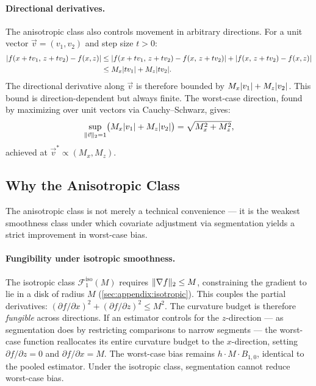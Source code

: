 \paragraph{Directional derivatives.}
The anisotropic class also controls movement in arbitrary directions.
For a unit vector $\vec{v} = (v_1, v_2)$ and step size $t > 0$:
\begin{align}
	\lvert f(x + tv_1,\, z + tv_2) - f(x, z)\rvert
	&\leq \lvert f(x + tv_1,\, z + tv_2) - f(x,\, z + tv_2)\rvert + \lvert f(x,\, z + tv_2) - f(x, z)\rvert \nonumber\\
	&\leq M_x \lvert tv_1\rvert + M_z \lvert tv_2\rvert. \label{eq:aniso_directional}
\end{align}
The directional derivative along $\vec{v}$ is therefore bounded by $M_x\lvert v_1\rvert + M_z\lvert v_2\rvert$.
This bound is direction-dependent but always finite.
The worst-case direction, found by maximizing over unit vectors via Cauchy--Schwarz, gives:
\begin{equation}\label{eq:aniso_worst_direction}
	\sup_{\lVert\vec{v}\rVert_2 = 1} \bigl(M_x\lvert v_1\rvert + M_z\lvert v_2\rvert\bigr) = \sqrt{M_x^2 + M_z^2},
\end{equation}
achieved at $\vec{v}^* \propto (M_x, M_z)$.


\subsection{Why the Anisotropic Class}\label{sec:smoothness:discussion}

The anisotropic class is not merely a technical convenience --- it is the weakest smoothness class under which covariate adjustment via segmentation yields a strict improvement in worst-case bias.

\paragraph{Fungibility under isotropic smoothness.}
The isotropic class $\mathcal{F}_1^{\mathrm{iso}}(M)$ requires $\lVert\nabla f\rVert_2 \leq M$, constraining the gradient to lie in a disk of radius $M$ (\cref{sec:appendix:isotropic}).
This couples the partial derivatives: $(\partial f / \partial x)^2 + (\partial f / \partial z)^2 \leq M^2$.
The curvature budget is therefore \emph{fungible} across directions.
If an estimator controls for the $z$-direction --- as segmentation does by restricting comparisons to narrow segments --- the worst-case function reallocates its entire curvature budget to the $x$-direction, setting $\partial f / \partial z = 0$ and $\partial f / \partial x = M$.
The worst-case bias remains $h \cdot M \cdot B_{1,0}$, identical to the pooled estimator.
Under the isotropic class, segmentation cannot reduce worst-case bias.


